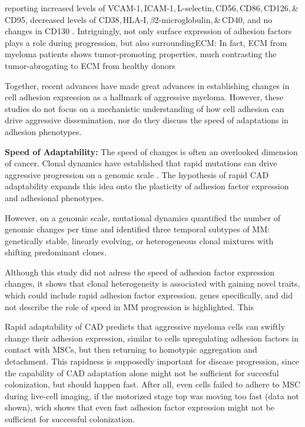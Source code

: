 reporting %
increased levels of VCAM-1,\,ICAM-1,\,L-selectin,\,CD56,\,CD86,\,CD126,\,\&\,CD95, %
decreased levels of CD38,\,HLA-I,\,$\beta$2-microglobulin,\,\&\,CD40, and %
no changes in CD130 %
\cite{terposIncreasedCirculatingVCAM12016, perez-andresClonalPlasmaCells2005}.
Intriguingly, not only surface expression of adhesion factors plays a role
during progression, but also surrounding\ac{ECM}: In fact, \ac{ECM} from myeloma
patients shows tumor-promoting properties, much contrasting the tumor-abrogating
to \ac{ECM} from healthy donors
\cite{ibraheemBMMSCsderivedECMModifies2019}

Together, recent advances have made great advances in establishing changes in
cell adhesion expression as a hallmark of aggressive myeloma. However, these
studies do not focus on a mechanistic understanding of how cell adhesion can
drive aggressive dissemination, nor do they discuss the speed of adaptations in
adhesion phenotypes.

\textbf{Speed of Adaptability:}
The speed of changes is often an overlooked dimension of cancer. Clonal dynamics
have established that rapid mutations can drive aggressive progression on a
genomic scale \citet{keatsClonalCompetitionAlternating2012}. The hypothesis
of rapid \ac{CAD} adaptability expands this idea onto the plasticity of adhesion factor expression and adhesional phenotypes.

However,
on a genomic scale, mutational dynamics
\citet{keatsClonalCompetitionAlternating2012} quantified the number of genomic
changes per time and identified three temporal subtypes of MM: genetically
stable, linearly evolving, or heterogeneous clonal mixtures with shifting
predominant clones.

Although this study did not adress the speed of adhesion
factor expression changes, it shows that clonal heterogeneity is associated with
gaining novel traits, which could include rapid adhesion factor expression.
genes specifically, and did not describe the role of speed in MM progression is
highlighted. This

Rapid adaptability of \ac{CAD} predicts that aggressive myeloma cells can
swiftly change their adhesion expression, similar to \INA cells upregulating
adhesion factors in contact with \acp{MSC}, but then returning to homotypic
aggregation and detachment. This rapidness is supposedly important for disease
progression, since the capability of \ac{CAD} adaptation  alone might not be
sufficient for succesful colonization, but should happen fast. After all, even
\INA cells failed to adhere to \ac{MSC} during live-cell imaging, if the
motorized stage top was moving too fast (data not shown), wich shows that even
fast adhesion factor expression might not be sufficient for successful
colonization.

